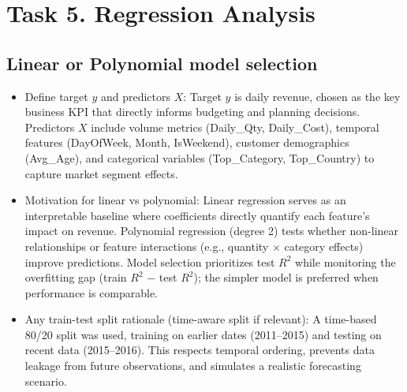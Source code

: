 \documentclass[11pt]{article}
\begin{document}
\newpage
\section{Task 5. Regression Analysis}

\subsection{Linear or Polynomial model selection}
\begin{itemize}[leftmargin=*]
    \item Define target $y$ and predictors $X$: Target $y$ is daily revenue, chosen as the key business KPI 
    that directly informs budgeting and planning decisions. 
    Predictors $X$ include volume metrics (Daily\_Qty, Daily\_Cost), temporal features 
    (DayOfWeek, Month, IsWeekend), customer demographics (Avg\_Age), and categorical 
    variables (Top\_Category, Top\_Country) to capture market segment effects.
    \item Motivation for linear vs polynomial: Linear regression serves as an interpretable baseline 
    where coefficients directly quantify each feature's impact on revenue. 
    Polynomial regression (degree 2) tests whether non-linear relationships or feature 
    interactions (e.g., quantity $\times$ category effects) improve predictions. 
    Model selection prioritizes test $R^2$ while monitoring the overfitting gap 
    (train $R^2$ $-$ test $R^2$); the simpler model is preferred when performance is comparable.
    \item Any train-test split rationale (time-aware split if relevant): A time-based 80/20 split 
    was used, training on earlier dates (2011--2015) and testing on recent data (2015--2016). 
    This respects temporal ordering, prevents data leakage from future observations, 
    and simulates a realistic forecasting scenario.
\end{itemize}
\end{document}
